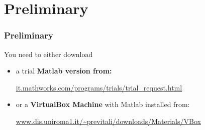 \section{Preliminary}

\begin{frame}
	\frametitle{Preliminary}
	
	\Large
	
	You need to either download \\
	
	\begin{itemize}
		\item a trial \textbf{Matlab version from: } \\
			  \vspace{0.1cm}
			  
			  \begin{center}
			  	  \normalsize
				  \url{it.mathworks.com/programs/trials/trial_request.html}
			  \end{center}
		
		\vspace{0.3cm}
		
		\item or a \textbf{VirtualBox Machine} with Matlab installed from: \\
			  \vspace{0.1cm}
			  
			  \begin{center}
				  \normalsize
				  \url{www.dis.uniroma1.it/~previtali/downloads/Materials/VBox}
			  \end{center}
	\end{itemize}
\end{frame}

